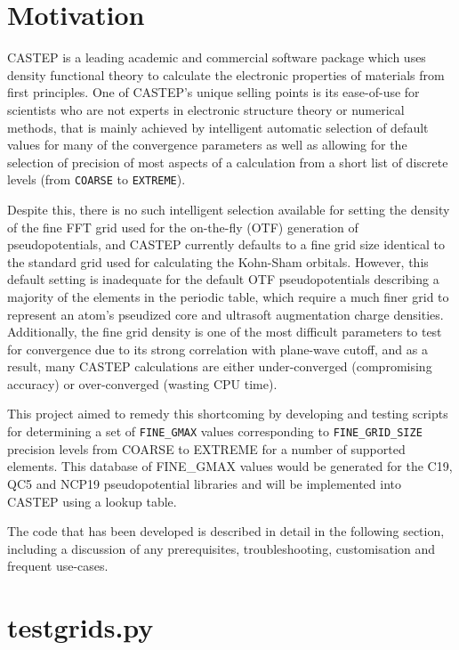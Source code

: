 \section{Motivation}

CASTEP is a leading academic and commercial software package which uses density functional theory to calculate the electronic properties of materials from first principles. One of CASTEP's unique selling points is its ease-of-use for scientists who are not experts in electronic structure theory or numerical methods, that is mainly achieved by intelligent automatic selection of default values for many of the convergence parameters as well as allowing for the selection of precision of most aspects of a calculation from a short list of discrete levels (from \texttt{COARSE} to \texttt{EXTREME}).

Despite this, there is no such intelligent selection available for setting the density of the fine FFT grid used for the on-the-fly (OTF) generation of pseudopotentials, and CASTEP currently defaults to a fine grid size identical to the standard grid used for calculating the Kohn-Sham orbitals. However, this default setting is inadequate for the default OTF pseudopotentials describing a majority of the elements in the periodic table, which require a much finer grid to represent an atom's pseudized core and ultrasoft augmentation charge densities. Additionally, the fine grid density is one of the most difficult parameters to test for convergence due to its strong correlation with plane-wave cutoff, and as a result, many CASTEP calculations are either under-converged (compromising accuracy) or over-converged (wasting CPU time).

This project aimed to remedy this shortcoming by developing and testing scripts for determining a set of \texttt{FINE\_GMAX} values corresponding to \texttt{FINE\_GRID\_SIZE} precision levels from COARSE to EXTREME for a number of supported elements. This database of FINE\_GMAX values would be generated for the C19, QC5 and NCP19 pseudopotential libraries and will be implemented into CASTEP using a lookup table.

The code that has been developed is described in detail in the following section, including a discussion of any prerequisites, troubleshooting, customisation and frequent use-cases.

\section{testgrids.py}

